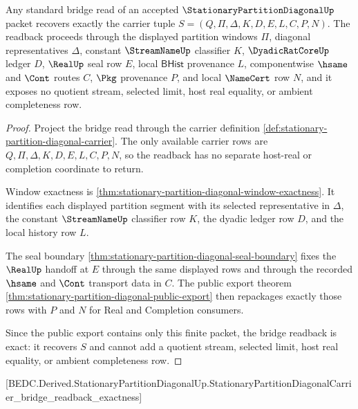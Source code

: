 \begin{theorem}
\label{thm:stationary-partition-diagonal-bridge-readback-exactness}
Any standard bridge read of an accepted $\StationaryPartitionDiagonalUp$ packet recovers exactly the carrier tuple $S=(Q,\Pi,\Delta,K,D,E,L,C,P,N)$. The readback proceeds through the displayed partition windows $\Pi$, diagonal representatives $\Delta$, constant $\StreamNameUp$ classifier $K$, $\DyadicRatCoreUp$ ledger $D$, $\RealUp$ seal row $E$, local $\mathsf{BHist}$ provenance $L$, componentwise $\hsame$ and $\Cont$ routes $C$, $\Pkg$ provenance $P$, and local $\NameCert$ row $N$, and it exposes no quotient stream, selected limit, host real equality, or ambient completeness row.
\end{theorem}
\begin{proof}
Project the bridge read through the carrier definition \autoref{def:stationary-partition-diagonal-carrier}. The only available carrier rows are $Q,\Pi,\Delta,K,D,E,L,C,P,N$, so the readback has no separate host-real or completion coordinate to return.

Window exactness is \autoref{thm:stationary-partition-diagonal-window-exactness}. It identifies each displayed partition segment with its selected representative in $\Delta$, the constant $\StreamNameUp$ classifier row $K$, the dyadic ledger row $D$, and the local history row $L$.

The seal boundary \autoref{thm:stationary-partition-diagonal-seal-boundary} fixes the $\RealUp$ handoff at $E$ through the same displayed rows and through the recorded $\hsame$ and $\Cont$ transport data in $C$. The public export theorem \autoref{thm:stationary-partition-diagonal-public-export} then repackages exactly those rows with $P$ and $N$ for Real and Completion consumers.

Since the public export contains only this finite packet, the bridge readback is exact: it recovers $S$ and cannot add a quotient stream, selected limit, host real equality, or ambient completeness row.
\end{proof}

[BEDC.Derived.StationaryPartitionDiagonalUp.StationaryPartitionDiagonalCarrier\_bridge\_readback\_exactness]

